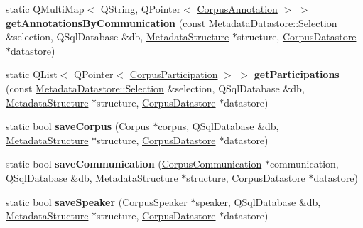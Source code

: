 \begin{DoxyCompactItemize}
static Q\+Multi\+Map$<$ Q\+String, Q\+Pointer$<$ \hyperlink{class_corpus_annotation}{Corpus\+Annotation} $>$ $>$ {\bfseries get\+Annotations\+By\+Communication} (const \hyperlink{class_metadata_datastore_1_1_selection}{Metadata\+Datastore\+::\+Selection} \&selection, Q\+Sql\+Database \&db, \hyperlink{class_metadata_structure}{Metadata\+Structure} $\ast$structure, \hyperlink{class_corpus_datastore}{Corpus\+Datastore} $\ast$datastore)
\item 
\mbox{\label{class_s_q_l_serialiser_metadata_ae6610d954df5662c5a744fff0c8caa03}} 
static Q\+List$<$ Q\+Pointer$<$ \hyperlink{class_corpus_participation}{Corpus\+Participation} $>$ $>$ {\bfseries get\+Participations} (const \hyperlink{class_metadata_datastore_1_1_selection}{Metadata\+Datastore\+::\+Selection} \&selection, Q\+Sql\+Database \&db, \hyperlink{class_metadata_structure}{Metadata\+Structure} $\ast$structure, \hyperlink{class_corpus_datastore}{Corpus\+Datastore} $\ast$datastore)
\item 
\mbox{\label{class_s_q_l_serialiser_metadata_ad305511975f3962022a40a3ff97071b4}} 
static bool {\bfseries save\+Corpus} (\hyperlink{class_corpus}{Corpus} $\ast$corpus, Q\+Sql\+Database \&db, \hyperlink{class_metadata_structure}{Metadata\+Structure} $\ast$structure, \hyperlink{class_corpus_datastore}{Corpus\+Datastore} $\ast$datastore)
\item 
\mbox{\label{class_s_q_l_serialiser_metadata_a0f91835aadcca527554d2ec655d4e9b4}} 
static bool {\bfseries save\+Communication} (\hyperlink{class_corpus_communication}{Corpus\+Communication} $\ast$communication, Q\+Sql\+Database \&db, \hyperlink{class_metadata_structure}{Metadata\+Structure} $\ast$structure, \hyperlink{class_corpus_datastore}{Corpus\+Datastore} $\ast$datastore)
\item 
\mbox{\label{class_s_q_l_serialiser_metadata_a9b73dd06279fe543c001e4ebfd453800}} 
static bool {\bfseries save\+Speaker} (\hyperlink{class_corpus_speaker}{Corpus\+Speaker} $\ast$speaker, Q\+Sql\+Database \&db, \hyperlink{class_metadata_structure}{Metadata\+Structure} $\ast$structure, \hyperlink{class_corpus_datastore}{Corpus\+Datastore} $\ast$datastore)
\item 
\mbox{\label{class_s_q_l_serialiser_metadata_aedb35a0a6600ea4dde5383f754fc0a43}} 

\end{DoxyCompactItemize}
